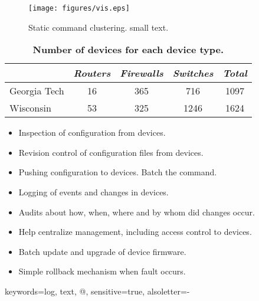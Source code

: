 
\begin{figure}[t]
\centering\texttt{[image: figures/vis.eps]}
\caption{Static command clustering.
\textmd{small text.}}
\label{fig:statemachine}
\end{figure}



\begin{table}[t] 
\begin{center}
\begin{small}
\begin{tabular}{l|c|c|c|c} 
& \em Routers & \em Firewalls & \em Switches & {\em Total}  \\ \hline
Georgia Tech & 16 & 365 & 716 & 1097 \\
Wisconsin & 53 & 325 & 1246 & 1624 \\
\end{tabular} 
\caption{\bf Number of devices for each device type.}
\label{tab:sample_network} 
\end{small}
\end{center}
\end{table}



\begin{itemize}
\itemsep=-1pt
\item Inspection of configuration from devices.
\item Revision control of configuration files from devices.
\item Pushing configuration to devices. Batch the command.
\item Logging of events and changes in devices.
\item Audits about how, when, where and by whom did changes occur. 
\item Help centralize management, including access control to devices.
\item Batch update and upgrade of device firmware.
\item Simple rollback mechanism when fault occurs.
\end{itemize}



{keywords={log, text, @}, sensitive=true, alsoletter={-}}

